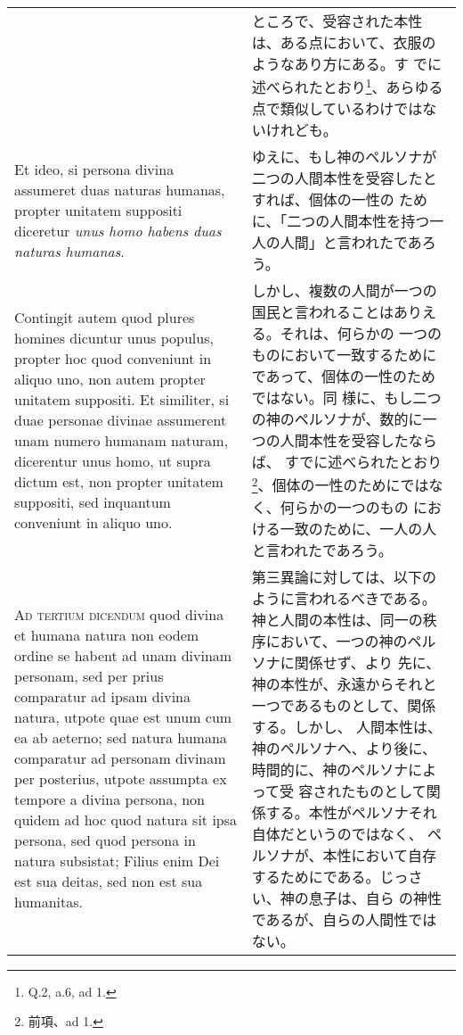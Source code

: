 \documentclass[10pt]{jsarticle} %
\begin{document}
\begin{longtable}{p{21em}p{21em}}
&

ところで、受容された本性は、ある点において、衣服のようなあり方にある。す
 でに述べられたとおり\footnote{Q.2, a.6, ad 1.}、あらゆる点で類似しているわけではないけれども。

\\


Et ideo, si persona divina assumeret duas naturas humanas, propter
unitatem suppositi diceretur {\itshape unus homo habens duas naturas
humanas}. 



&

ゆえに、もし神のペルソナが二つの人間本性を受容したとすれば、個体の一性の
 ために、「二つの人間本性を持つ一人の人間」と言われたであろう。

\\


Contingit autem quod plures homines dicuntur unus populus,
propter hoc quod conveniunt in aliquo uno, non autem propter unitatem
suppositi. Et similiter, si duae personae divinae assumerent unam numero
humanam naturam, dicerentur unus homo, ut supra dictum est, non propter
unitatem suppositi, sed inquantum conveniunt in aliquo uno.


&

しかし、複数の人間が一つの国民と言われることはありえる。それは、何らかの
 一つのものにおいて一致するためにであって、個体の一性のためではない。同
 様に、もし二つの神のペルソナが、数的に一つの人間本性を受容したならば、
 すでに述べられたとおり\footnote{前項、ad 1.}、個体の一性のためにではなく、何らかの一つのもの
 における一致のために、一人の人と言われたであろう。




\\



{\scshape Ad tertium dicendum} quod divina et humana natura non eodem ordine se
habent ad unam divinam personam, sed per prius comparatur ad ipsam
divina natura, utpote quae est unum cum ea ab aeterno; sed natura humana
comparatur ad personam divinam per posterius, utpote assumpta ex tempore
a divina persona, non quidem ad hoc quod natura sit ipsa persona, sed
quod persona in natura subsistat; Filius enim Dei est sua deitas, sed non
est sua humanitas. 

&

第三異論に対しては、以下のように言われるべきである。
神と人間の本性は、同一の秩序において、一つの神のペルソナに関係せず、より
 先に、神の本性が、永遠からそれと一つであるものとして、関係する。しかし、
 人間本性は、神のペルソナへ、より後に、時間的に、神のペルソナによって受
 容されたものとして関係する。本性がペルソナそれ自体だというのではなく、
 ペルソナが、本性において自存するためにである。じっさい、神の息子は、自ら
 の神性であるが、自らの人間性ではない。



\end{longtable}
\end{document}
